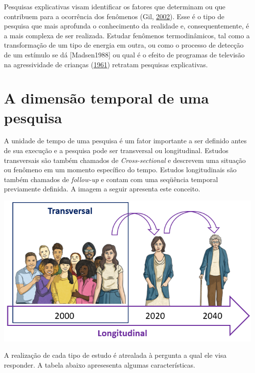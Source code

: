 \documentclass[
]{book}
\begin{document}
Pesquisas explicativas visam identificar os fatores que determinam ou
que contribuem para a ocorrência dos fenômenos (Gil,
\protect\hyperlink{ref-gil2002}{2002}). Esse é o tipo de pesquisa que
mais aprofunda o conhecimento da realidade e, consequentemente, é a mais
complexa de ser realizada. Estudar fenômenos termodinâmicos, tal como a
transformação de um tipo de energia em outra, ou como o processo de
detecção de um estímulo se dá {[}Madsen1988{]} ou qual é o efeito de
programas de televisão na agressividade de crianças
(\protect\hyperlink{ref-Bandura1961}{1961}) retratam pesquisas
explicativas.

\hypertarget{a-dimensuxe3o-temporal-de-uma-pesquisa}{%
\section{A dimensão temporal de uma
pesquisa}\label{a-dimensuxe3o-temporal-de-uma-pesquisa}}

A unidade de tempo de uma pesquisa é um fator importante a ser definido
antes de sua execução e a pesquisa pode ser transversal ou longitudinal.
Estudos transversais são também chamados de \emph{Cross-sectional} e
descrevem uma situação ou fenômeno em um momento específico do tempo.
Estudos longitudinais são também chamados de \emph{follow-up} e contam
com uma seqüência temporal previamente definida. A imagem a seguir
apresenta este conceito.

\includegraphics{./img/cap_transversal_longitudinal.png}

A realização de cada tipo de estudo é atrealada à pergunta a qual ele
visa responder. A tabela abaixo apresesenta algumas características.
\end{document}
